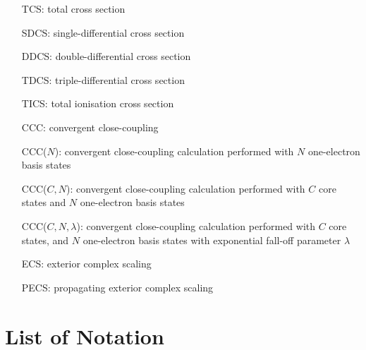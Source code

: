 \documentclass[]{article}
\begin{document}
\begin{itemize}
\item[TCS:]
  total cross section
\item[SDCS:]
  single-differential cross section
\item[DDCS:]
  double-differential cross section
\item[TDCS:]
  triple-differential cross section
\item[TICS:]
  total ionisation cross section
\item[CCC:]
  convergent close-coupling
\item[CCC($N$):]
  convergent close-coupling calculation performed with $N$ one-electron basis
  states
\item[CCC($C, N$):]
  convergent close-coupling calculation performed with $C$ core states and $N$
  one-electron basis states
\item[CCC($C, N, \lambda$):]
  convergent close-coupling calculation performed with $C$ core states, and $N$
  one-electron basis states with exponential fall-off parameter $\lambda$
\item[ECS:]
  exterior complex scaling
\item[PECS:]
  propagating exterior complex scaling
\end{itemize}

\clearpage

\section*{List of Notation}
\end{document}
